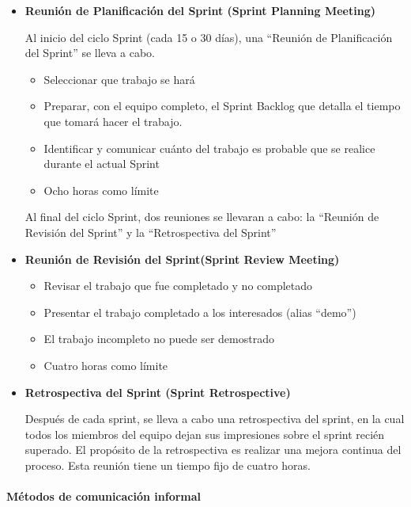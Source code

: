 \begin{itemize}
	\item \textbf{ Reunión de Planificación del Sprint (Sprint Planning Meeting)}

Al inicio del ciclo Sprint (cada 15 o 30 días), una “Reunión de Planificación del Sprint” se lleva a cabo.
	\begin{itemize}
	    \item Seleccionar que trabajo se hará
		\item    Preparar, con el equipo completo, el Sprint Backlog que detalla el tiempo que tomará hacer el trabajo.
		\item    Identificar y comunicar cuánto del trabajo es probable que se realice durante el actual Sprint
		\item    Ocho horas como límite
	\end{itemize}
Al final del ciclo Sprint, dos reuniones se llevaran a cabo: la “Reunión de Revisión del Sprint” y la “Retrospectiva del Sprint”
	\item \textbf{Reunión de Revisión del Sprint(Sprint Review Meeting)}
		\begin{itemize}
			\item    Revisar el trabajo que fue completado y no completado
			\item    Presentar el trabajo completado a los interesados (alias “demo”)
			\item    El trabajo incompleto no puede ser demostrado
			\item    Cuatro horas como límite
		\end{itemize}

	\item \textbf{Retrospectiva del Sprint (Sprint Retrospective)}

Después de cada sprint, se lleva a cabo una retrospectiva del sprint, en la cual todos los miembros del equipo dejan sus impresiones sobre el sprint recién superado. El propósito de la retrospectiva es realizar una mejora continua del proceso. Esta reunión tiene un tiempo fijo de cuatro horas.

	\end{itemize}

\paragraph{Métodos de comunicación informal}

